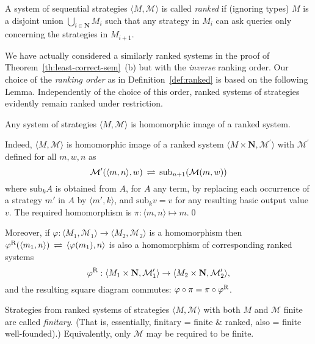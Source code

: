 \documentclass[fleqn]{LMCS}
\theoremstyle{plain}\newtheorem{satz}[thm]{Satz}
\theoremstyle{plain}\newtheorem{hyp}[thm]{Hypothesis}
\theoremstyle{plain}\newtheorem{hyps}[thm]{Hypotheses}
\theoremstyle{definition}\newtheorem{note}[thm]{Note}
\newcommand{\bYdef}{\mathrel{\BYDEF}}
\newcommand{\BYDEF}{\mbox{$\hspace{.2em}\rightleftharpoons\hspace{.2em}$}}
\newcommand{\pr}{^{\prime}}
\newcommand{\arr}{\rightarrow}
\newcommand{\la}{\langle}
\newcommand{\ra}{\rangle}
\newcommand{\tuple}[1]{\la #1 \ra}
\newcommand{\NN}{\mathbf{N}}
\newcommand{\MM}{{\mathcal M}}
\newcommand{\?}{\mbox{?}}
\begin{document}
\begin{defi}\label{def:ranked}A system of sequential strategies $\tuple{M,\MM}$ is called \emph{ranked} if 
(ignoring types)
$M$ is a disjoint union $\bigcup_{i\in \NN} M_i$
such that any strategy
in $M_i$ can ask queries only concerning the strategies in $M_{i+1}$.  
\end{defi}
\noindent
We have actually considered a similarly ranked systems in the proof of 
Theorem~\ref{th:least-correct-sem}~(b) but with the \emph{inverse} ranking order. 
Our choice of the \emph{ranking order} as in Definition~\ref{def:ranked} is based  
on the following Lemma. Independently of the choice of this order, 
ranked systems of strategies evidently remain ranked under restriction. 






\begin{lem}\label{lemma:ranked}
Any system of strategies $\tuple{M,\MM}$ is 
homomorphic image of a ranked system. 
\end{lem}
\proof 
Indeed, $\tuple{M,\MM}$ is homomorphic image of a ranked system 
$\tuple{M\times \NN, \MM\pr}$ with $\MM\pr$ defined for all $m,w,n$ as 
\begin{equation*}
\MM\pr(\tuple{m,n},w)
\bYdef\textrm{sub}_{n+1}(\MM(m,w))
\end{equation*}
where $\textrm{sub}_{k}A$ is obtained from $A$, for $A$ any term, by replacing each 
occurrence of a strategy $m'$ in $A$ by
$\tuple{m',k}$, and 
$\textrm{sub}_{k}v=v$ for any resulting basic output value $v$.  
The required homomorphism is $\pi:\tuple{m,n}\mapsto m$.\qed


\noindent
Moreover, if $\varphi:\tuple{M_1,\MM_1}\arr\tuple{M_2,\MM_2}$ is a 
homomorphism 
then $\varphi^{\rm R}(\tuple{m_1,n})\bYdef\tuple{\varphi(m_1),n}$ is 
also a homomorphism of corresponding ranked systems 
\[
\varphi^{\rm R}:\tuple{M_1\times \NN,\MM_1\pr}\arr
\tuple{M_2\times \NN, \MM_2\pr},  
\]
and the resulting square diagram commutes: 
$\varphi \circ\pi=\pi \circ\varphi^{\rm R}$. 




\begin{defi}\label{def:finitary}Strategies from
ranked systems of strategies $\tuple{M,\MM}$ with  
both $M$ and $\MM$ finite are called \emph{finitary}. 
(That is, essentially, finitary = finite $\&$ ranked, also = finite well-founded).) 
Equivalently, only $\MM$ may be required to be finite. 
\end{defi}
\end{document}
